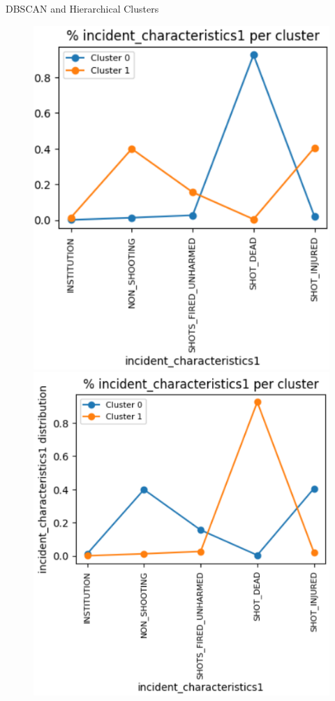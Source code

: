 \begin{frame}{DBSCAN and Hierarchical Clusters}
    \begin{figure}
    \centering
    \includegraphics[scale=0.29]{img/clustering/dbscan1.png}
    \includegraphics[scale=0.31]{img/clustering/hier2.png}
    \label{hier}
\end{figure}
\end{frame}